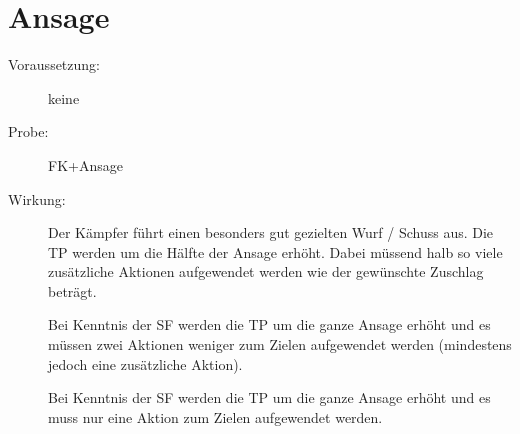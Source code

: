 \section{Ansage}
\label{fernkampf.ansage}
\begin{description}
    \item[Voraussetzung:]
        keine
    \item[Probe:]
        FK+Ansage
    \item[Wirkung:]
        Der Kämpfer führt einen besonders gut gezielten Wurf / Schuss aus.
        Die TP werden um die Hälfte der Ansage erhöht.
        Dabei müssend halb so viele zusätzliche Aktionen aufgewendet werden wie der gewünschte Zuschlag beträgt.

        Bei Kenntnis der SF  werden die TP um die ganze Ansage erhöht und es müssen zwei Aktionen weniger zum Zielen aufgewendet werden (mindestens jedoch eine zusätzliche Aktion).

        Bei Kenntnis der SF  werden die TP um die ganze Ansage erhöht und es muss nur eine Aktion zum Zielen aufgewendet werden.
\end{description}

